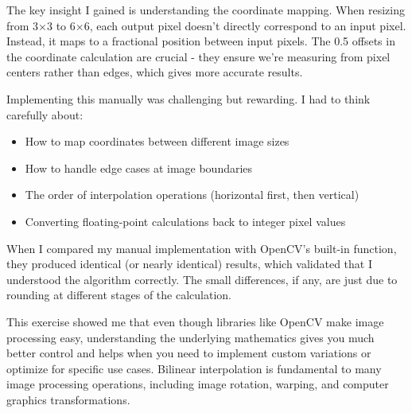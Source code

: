 \documentclass[12pt,a4paper]{report}
\begin{document}
The key insight I gained is understanding the coordinate mapping. When resizing from 3×3 to 6×6, each output pixel doesn't directly correspond to an input pixel. Instead, it maps to a fractional position between input pixels. The 0.5 offsets in the coordinate calculation are crucial - they ensure we're measuring from pixel centers rather than edges, which gives more accurate results.

Implementing this manually was challenging but rewarding. I had to think carefully about:
\begin{itemize}
    \item How to map coordinates between different image sizes
    \item How to handle edge cases at image boundaries
    \item The order of interpolation operations (horizontal first, then vertical)
    \item Converting floating-point calculations back to integer pixel values
\end{itemize}

When I compared my manual implementation with OpenCV's built-in function, they produced identical (or nearly identical) results, which validated that I understood the algorithm correctly. The small differences, if any, are just due to rounding at different stages of the calculation.

This exercise showed me that even though libraries like OpenCV make image processing easy, understanding the underlying mathematics gives you much better control and helps when you need to implement custom variations or optimize for specific use cases. Bilinear interpolation is fundamental to many image processing operations, including image rotation, warping, and computer graphics transformations.
\end{document}
